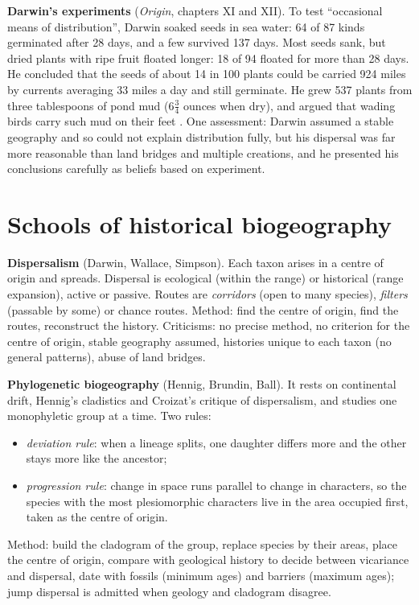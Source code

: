 \textbf{Darwin's experiments}
(\emph{Origin}, chapters XI and XII). To
test ``occasional means of
distribution'', Darwin soaked seeds in sea
water: 64 of 87 kinds germinated after 28
days, and a few survived 137 days. Most
seeds sank, but dried plants with ripe
fruit floated longer: 18 of 94 floated for
more than 28 days. He concluded that the
seeds of about 14 in 100 plants could be
carried 924 miles by currents averaging 33
miles a day and still germinate. He grew
537 plants from three tablespoons of pond
mud ($6\frac{3}{4}$ ounces when dry), and
argued that wading birds carry such mud on
their feet \cite[Chapters XI and
XII]{darwin2008origin}. One assessment:
Darwin assumed a stable
geography and so could not explain
distribution fully, but his dispersal was
far more reasonable than land bridges and
multiple creations, and he presented his
conclusions carefully as beliefs based on
experiment.

\section{Schools of historical biogeography}
\label{section-schools-biogeography}

\textbf{Dispersalism} (Darwin, Wallace,
Simpson). Each taxon arises in a centre of
origin and spreads. Dispersal is
ecological (within the range) or
historical (range expansion), active or
passive. Routes are \emph{corridors}
(open to many species), \emph{filters}
(passable by some) or chance routes.
Method: find the centre of origin, find
the routes, reconstruct the history.
Criticisms: no precise method, no
criterion for the centre of origin,
stable geography assumed, histories unique
to each taxon (no general patterns), abuse
of land bridges.

\textbf{Phylogenetic biogeography}
(Hennig, Brundin, Ball). It rests on
continental drift, Hennig's cladistics and
Croizat's critique of dispersalism, and
studies one monophyletic group at a time.
Two rules:
\begin{itemize}
\item \emph{deviation rule}: when a
lineage splits, one daughter differs more
and the other stays more like the
ancestor;
\item \emph{progression rule}: change in
space runs parallel to change in
characters, so the species with the most
plesiomorphic characters live in the area
occupied first, taken as the centre of
origin.
\end{itemize}
Method: build the cladogram of the group,
replace species by their areas, place the
centre of origin, compare with geological
history to decide between vicariance and
dispersal, date with fossils (minimum
ages) and barriers (maximum ages); jump
dispersal is admitted when geology and
cladogram disagree.

